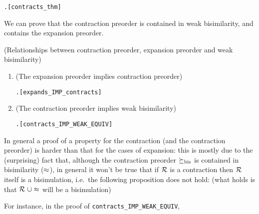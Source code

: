 \begin{alltt}
\HOLTokenTurnstile{}  \HOLSymConst{\HOLTokenContracts{}}  \HOLSymConst{\HOLTokenEquiv{}} \HOLSymConst{\HOLTokenExists{}}.    \HOLSymConst{\HOLTokenConj{}}  \hfill{[contracts_thm]}
\end{alltt}

We can prove that the contraction preorder is contained in weak bisimilarity,
and contains the expansion preorder.
\begin{proposition}{(Relationships between contraction preorder,
    expansion preorder and weak bisimilarity)}
\begin{enumerate}
\item (The expansion preorder implies contraction preorder)
\begin{alltt}
\HOLTokenTurnstile{} \HOLSymConst{\HOLTokenForall{}} .  \HOLSymConst{\HOLTokenExpands{}}  \HOLSymConst{\HOLTokenImp{}}  \HOLSymConst{\HOLTokenContracts{}} \hfill[expands_IMP_contracts]
\end{alltt}
\item (The contraction preorder implies weak bisimilarity)
\begin{alltt}
\HOLTokenTurnstile{} \HOLSymConst{\HOLTokenForall{}} .  \HOLSymConst{\HOLTokenContracts{}}  \HOLSymConst{\HOLTokenImp{}}  \HOLSymConst{\HOLTokenWeakEQ} \hfill[contracts_IMP_WEAK_EQUIV]
\end{alltt}
\end{enumerate}
\end{proposition}
In general a proof of a property for the contraction (and the contraction preorder) is
harder than that for the cases of expansion: this is mostly due to the (surprising) fact
  that, although the contraction preorder $\mathrel{\succeq_{\rm{bis}}}$ is contained in
  bisimilarity ($\approx$), in general it won't be true that
if ${\cal R}$ is a contraction then ${\cal R}$ itself is a bisimulation,
i.e.~the following proposition does not hold: (what holds is that ${\cal R}\ \cup \approx$ will be a bisimulation)
\begin{alltt}
\end{alltt}
For instance, in the proof of \texttt{contracts_IMP_WEAK_EQUIV},
